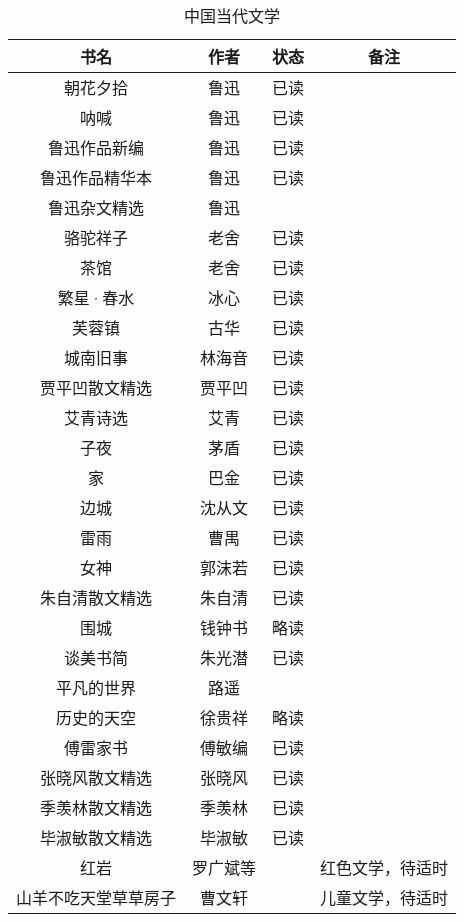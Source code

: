 \documentclass[UTF8,12pt]{ctexart}
\begin{document}
\begin{table}[h]
\centering
\begin{tabular}{cccc}
\toprule
书名&作者&状态&备注\\
\midrule
朝花夕拾&鲁迅&已读\\
呐喊&鲁迅&已读\\
鲁迅作品新编&鲁迅&已读\\
鲁迅作品精华本&鲁迅&已读\\
鲁迅杂文精选&鲁迅\\
骆驼祥子&老舍&已读\\
茶馆&老舍&已读\\
繁星·春水&冰心&已读\\
芙蓉镇&古华&已读\\
城南旧事&林海音&已读\\
贾平凹散文精选&贾平凹&已读\\
艾青诗选&艾青&已读\\
子夜&茅盾&已读\\
家&巴金&已读\\
边城&沈从文&已读\\
雷雨&曹禺&已读\\
女神&郭沫若&已读\\
朱自清散文精选&朱自清&已读\\
围城&钱钟书&略读\\
谈美书简&朱光潜&已读\\
平凡的世界&路遥\\
历史的天空&徐贵祥&略读\\
傅雷家书&傅敏编&已读\\
张晓风散文精选&张晓风&已读\\
季羡林散文精选&季羡林&已读\\
毕淑敏散文精选&毕淑敏&已读\\
红岩&罗广斌等&&红色文学，待适时\\
山羊不吃天堂草\space 草房子&曹文轩&&儿童文学，待适时\\
\bottomrule
\end{tabular}
\caption{中国当代文学}
\end{table}
\end{document}
